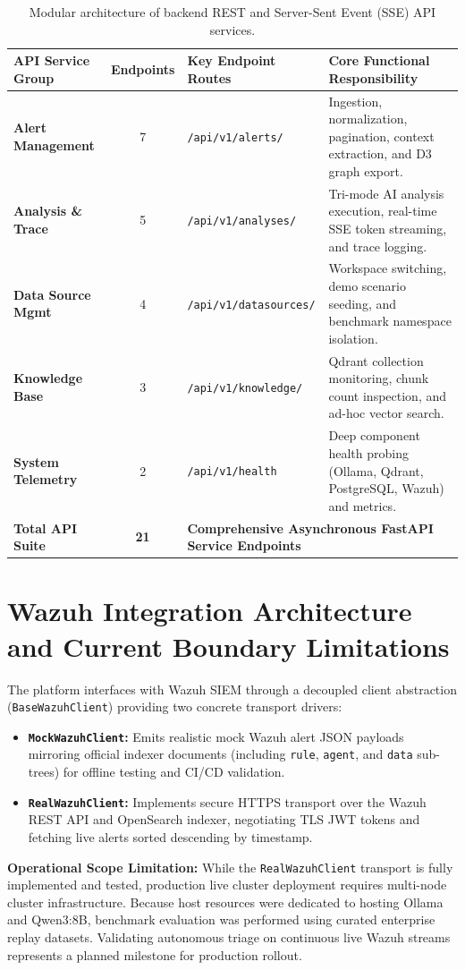 \begin{table}[!htbp]
\centering
\caption{Modular architecture of backend REST and Server-Sent Event (SSE) API services.}
\label{tab:api_catalog}
\small
\begin{tabularx}{\textwidth}{@{}l c p{4.2cm} X@{}}
\toprule
\textbf{API Service Group} & \textbf{Endpoints} & \textbf{Key Endpoint Routes} & \textbf{Core Functional Responsibility} \\
\midrule
\textbf{Alert Management}  & 7 & \texttt{/api/v1/alerts/} & Ingestion, normalization, pagination, context extraction, and D3 graph export. \\
\textbf{Analysis \& Trace} & 5 & \texttt{/api/v1/analyses/} & Tri-mode AI analysis execution, real-time SSE token streaming, and trace logging. \\
\textbf{Data Source Mgmt}  & 4 & \texttt{/api/v1/\allowbreak datasources/} & Workspace switching, demo scenario seeding, and benchmark namespace isolation. \\
\textbf{Knowledge Base}    & 3 & \texttt{/api/v1/\allowbreak knowledge/} & Qdrant collection monitoring, chunk count inspection, and ad-hoc vector search. \\
\textbf{System Telemetry}  & 2 & \texttt{/api/v1/health} & Deep component health probing (Ollama, Qdrant, PostgreSQL, Wazuh) and metrics. \\
\midrule
\textbf{Total API Suite}   & \textbf{21} & \multicolumn{2}{l}{\textbf{Comprehensive Asynchronous FastAPI Service Endpoints}} \\
\bottomrule
\end{tabularx}
\end{table}

\section{Wazuh Integration Architecture and Current Boundary Limitations}
\label{sec:wazuh_integration_arch}
The platform interfaces with Wazuh SIEM through a decoupled client abstraction (\texttt{BaseWazuhClient}) providing two concrete transport drivers:
\begin{itemize}[itemsep=1pt,topsep=2pt]
  \item \textbf{\texttt{MockWazuhClient}:} Emits realistic mock Wazuh alert JSON payloads mirroring official indexer documents (including \texttt{rule}, \texttt{agent}, and \texttt{data} sub-trees) for offline testing and CI/CD validation.
  \item \textbf{\texttt{RealWazuhClient}:} Implements secure HTTPS transport over the Wazuh REST API and OpenSearch indexer, negotiating TLS JWT tokens and fetching live alerts sorted descending by timestamp.
\end{itemize}

\textbf{Operational Scope Limitation:} While the \texttt{RealWazuhClient} transport is fully implemented and tested, production live cluster deployment requires multi-node cluster infrastructure. Because host resources were dedicated to hosting Ollama and Qwen3:8B, benchmark evaluation was performed using curated enterprise replay datasets. Validating autonomous triage on continuous live Wazuh streams represents a planned milestone for production rollout.